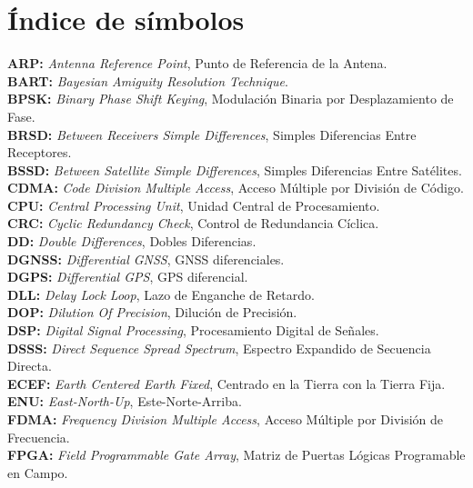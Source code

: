 \documentclass[a4paper,12pt,oneside,onecolumn,final,openright]{book}%
\begin{document}
\tableofcontents
\newpage

\chapter*{Índice de símbolos}
\noindent\textbf{ARP:} \textit{Antenna Reference Point}, Punto de Referencia de la Antena.\\
\textbf{BART:} \textit{Bayesian Amiguity Resolution Technique}.\\
\textbf{BPSK:} \textit{Binary Phase Shift Keying}, Modulación Binaria por Desplazamiento de Fase.\\
\textbf{BRSD:} \textit{Between Receivers Simple Differences}, Simples Diferencias Entre Receptores.\\
\textbf{BSSD:} \textit{Between Satellite Simple Differences}, Simples Diferencias Entre Satélites.\\
\textbf{CDMA:} \textit{Code Division Multiple Access}, Acceso Múltiple por División de Código.\\
\textbf{CPU:} \textit{Central Processing Unit}, Unidad Central de Procesamiento.\\
\textbf{CRC:} \textit{Cyclic Redundancy Check}, Control de Redundancia Cíclica.\\
\textbf{DD:} \textit{Double Differences}, Dobles Diferencias.\\
\textbf{DGNSS:} \textit{Differential GNSS}, GNSS diferenciales.\\
\textbf{DGPS:} \textit{Differential GPS}, GPS diferencial.\\
\textbf{DLL:} \textit{Delay Lock Loop}, Lazo de Enganche de Retardo.\\
\textbf{DOP:} \textit{Dilution Of Precision}, Dilución de Precisión.\\
\textbf{DSP:} \textit{Digital Signal Processing}, Procesamiento Digital de Señales.\\
\textbf{DSSS:} \textit{Direct Sequence Spread Spectrum}, Espectro Expandido de Secuencia Directa.\\
\textbf{ECEF:} \textit{Earth Centered Earth Fixed}, Centrado en la Tierra con la Tierra Fija.\\
\textbf{ENU:} \textit{East-North-Up}, Este-Norte-Arriba.\\
\textbf{FDMA:} \textit{Frequency Division Multiple Access}, Acceso Múltiple por División de Frecuencia.\\
\textbf{FPGA:} \textit{Field Programmable Gate Array}, Matriz de Puertas Lógicas Programable en Campo.\\
\end{document}
